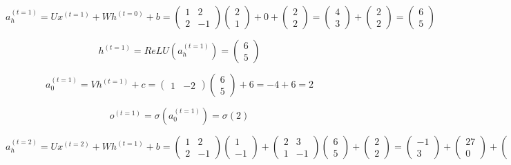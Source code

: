 $$ a_h^{(t=1)} = U x^{(t=1)} + W h^{(t=0)} + b = \begin{pmatrix} 1 & 2 \\ 2 & -1 \end{pmatrix} \begin{pmatrix} 2 \\ 1 \end{pmatrix} + 0 + \begin{pmatrix} 2 \\ 2 \end{pmatrix} = \begin{pmatrix} 4 \\ 3 \end{pmatrix} + \begin{pmatrix} 2 \\ 2 \end{pmatrix} = \begin{pmatrix} 6 \\ 5 \end{pmatrix} $$

$$ h^{(t=1)} = ReLU \left( a_h^{(t=1)} \right) = \begin{pmatrix} 6 \\ 5 \end{pmatrix} $$

$$ a_0^{(t=1)} = V h^{(t=1)} + c = \begin{pmatrix} 1 & -2 \end{pmatrix} \begin{pmatrix} 6 \\ 5 \end{pmatrix} + 6 = -4 + 6 = 2  $$

$$ o^{(t=1)} = \sigma \left( a_0^{(t=1)}  \right) = \sigma(2) $$

$$ a_h^{(t=2)} = U x^{(t=2)} + W h^{(t=1)} + b = \begin{pmatrix} 1 & 2 \\ 2 & -1 \end{pmatrix} \begin{pmatrix} 1 \\ -1 \end{pmatrix} +  \begin{pmatrix} 2 & 3 \\ 1 & -1 \end{pmatrix} \begin{pmatrix} 6 \\ 5 \end{pmatrix}  + \begin{pmatrix} 2 \\ 2 \end{pmatrix} = \begin{pmatrix} -1 \\ 3 \end{pmatrix} +  \begin{pmatrix} 27 \\ 0 \end{pmatrix} + \begin{pmatrix} 2 \\ 2 \end{pmatrix} = \begin{pmatrix} 28 \\ 5 \end{pmatrix}    $$

